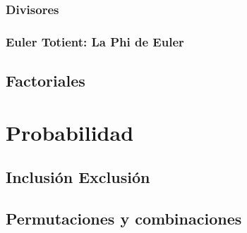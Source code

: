 \documentclass[12pt, fleqn]{report}                             %
\theoremstyle{break}                                            %
\begin{document}
            \subsection{Divisores}

            \subsection{Euler Totient: La Phi de Euler}

        \section{Factoriales}



    \clearpage
    \chapter{Probabilidad}

        \section{Inclusión Exclusión}

        \section{Permutaciones y combinaciones}

  
    \clearpage
\end{document}
